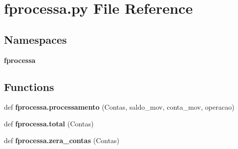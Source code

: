 \section{fprocessa.\+py File Reference}
\label{fprocessa_8py}
\subsection*{Namespaces}
\begin{DoxyCompactItemize}
\item 
 \textbf{ fprocessa}
\end{DoxyCompactItemize}
\subsection*{Functions}
\begin{DoxyCompactItemize}
\item 
def \textbf{ fprocessa.\+processamento} (Contas, saldo\+\_\+mov, conta\+\_\+mov, operacao)
\item 
def \textbf{ fprocessa.\+total} (Contas)
\item 
def \textbf{ fprocessa.\+zera\+\_\+contas} (Contas)
\end{DoxyCompactItemize}
